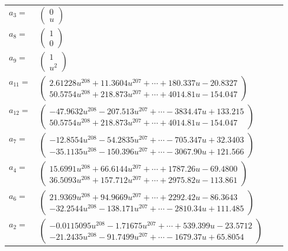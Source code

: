\documentclass[1p]{elsarticle_modified}
\theoremstyle{definition}
\begin{document}
\begin{tabular}{m{7pt} m{180pt} m{7pt} m{180pt} }
\flushright $a_{3}=$&$\begin{pmatrix}0\\u\end{pmatrix}$ \\
\flushright $a_{8}=$&$\begin{pmatrix}1\\0\end{pmatrix}$ \\
\flushright $a_{9}=$&$\begin{pmatrix}1\\u^2\end{pmatrix}$ \\
\flushright $a_{11}=$&$\begin{pmatrix}2.61228 u^{208}+11.3604 u^{207}+\cdots+180.337 u-20.8327\\50.5754 u^{208}+218.873 u^{207}+\cdots+4014.81 u-154.047\end{pmatrix}$ \\
\flushright $a_{12}=$&$\begin{pmatrix}-47.9632 u^{208}-207.513 u^{207}+\cdots-3834.47 u+133.215\\50.5754 u^{208}+218.873 u^{207}+\cdots+4014.81 u-154.047\end{pmatrix}$ \\
\flushright $a_{7}=$&$\begin{pmatrix}-12.8554 u^{208}-54.2835 u^{207}+\cdots-705.347 u+32.3403\\-35.1135 u^{208}-150.396 u^{207}+\cdots-3067.90 u+121.566\end{pmatrix}$ \\
\flushright $a_{4}=$&$\begin{pmatrix}15.6991 u^{208}+66.6144 u^{207}+\cdots+1787.26 u-69.4800\\36.5093 u^{208}+157.712 u^{207}+\cdots+2975.82 u-113.861\end{pmatrix}$ \\
\flushright $a_{6}=$&$\begin{pmatrix}21.9369 u^{208}+94.9669 u^{207}+\cdots+2292.42 u-86.3643\\-32.2544 u^{208}-138.171 u^{207}+\cdots-2810.34 u+111.485\end{pmatrix}$ \\
\flushright $a_{2}=$&$\begin{pmatrix}-0.0115095 u^{208}-1.71675 u^{207}+\cdots+539.399 u-23.5712\\-21.2435 u^{208}-91.7499 u^{207}+\cdots-1679.37 u+65.8054\end{pmatrix}$ \\

\end{tabular}
\end{document}
